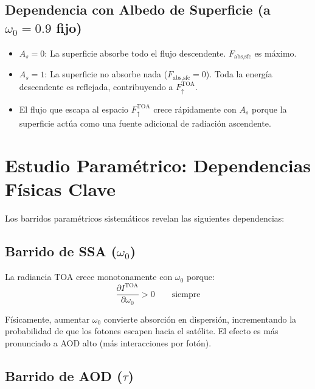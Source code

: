 \documentclass[a4paper,11pt]{article}
\begin{document}
\subsection{Dependencia con Albedo de Superficie (a $\omega_0 = 0.9$ fijo)}

\begin{itemize}
    \item $A_s = 0$: La superficie absorbe todo el flujo descendente.
          $F_{\text{abs,sfc}}$ es m\'aximo.

    \item $A_s = 1$: La superficie no absorbe nada ($F_{\text{abs,sfc}} = 0$).
          Toda la energ\'ia descendente es reflejada, contribuyendo a
          $F_\uparrow^{\text{TOA}}$.

    \item El flujo que escapa al espacio $F_\uparrow^{\text{TOA}}$ crece
          r\'apidamente con $A_s$ porque la superficie act\'ua como una fuente
          adicional de radiaci\'on ascendente.
\end{itemize}


\section{Estudio Param\'etrico: Dependencias F\'isicas Clave}
\label{sec:interp_param_study}

Los barridos param\'etricos sistem\'aticos revelan las siguientes dependencias:

\subsection{Barrido de SSA ($\omega_0$)}

La radiancia TOA crece monotonamente con $\omega_0$ porque:
\begin{equation}
    \frac{\partial I^{\text{TOA}}}{\partial\omega_0} > 0
    \qquad \text{siempre}
\end{equation}

F\'isicamente, aumentar $\omega_0$ convierte absorci\'on en dispersi\'on,
incrementando la probabilidad de que los fotones escapen hacia el sat\'elite.
El efecto es m\'as pronunciado a AOD alto (m\'as interacciones por fot\'on).

\subsection{Barrido de AOD ($\tau$)}
\end{document}
